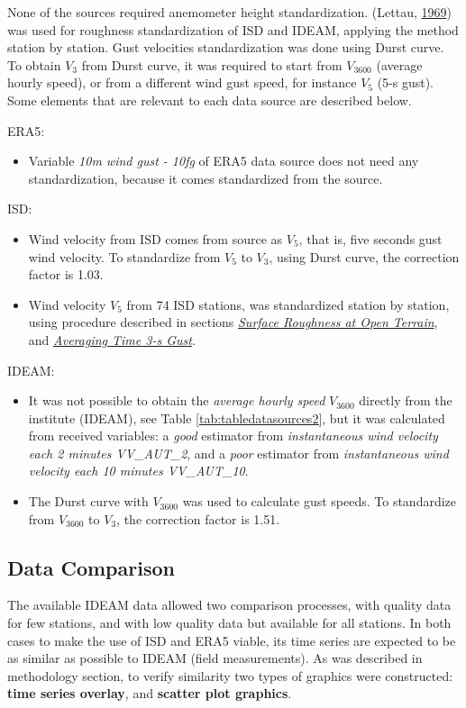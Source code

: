 \documentclass[12pt,oneside]{reedthesis}
\providecommand{\tightlist}{%
  \setlength{\itemsep}{0pt}\setlength{\parskip}{0pt}}
\begin{document}
None of the sources required anemometer height standardization. (Lettau, \protect\hyperlink{ref-Lettau1969}{1969}) was used for roughness standardization of ISD and IDEAM, applying the method station by station. Gust velocities standardization was done using Durst curve. To obtain \(V_3\) from Durst curve, it was required to start from \(V_{3600}\) (average hourly speed), or from a different wind gust speed, for instance \(V_5\) (5-s gust). Some elements that are relevant to each data source are described below.

ERA5:
\begin{itemize}
\tightlist
\item
  Variable \emph{10m wind gust - 10fg} of ERA5 data source does not need any standardization, because it comes standardized from the source.
\end{itemize}
ISD:
\begin{itemize}
\item
  Wind velocity from ISD comes from source as \(V_5\), that is, five seconds gust wind velocity. To standardize from \(V_5\) to \(V_3\), using Durst curve, the correction factor is 1.03.
\item
  Wind velocity \(V_5\) from 74 ISD stations, was standardized station by station, using procedure described in sections \emph{\protect\hyperlink{rmd-roughness}{Surface Roughness at Open Terrain}}, and \emph{\protect\hyperlink{rmd-gust}{Averaging Time 3-s Gust}}.
\end{itemize}
IDEAM:
\begin{itemize}
\item
  It was not possible to obtain the \emph{average hourly speed} \(V_{3600}\) directly from the institute (IDEAM), see Table \ref{tab:tabledatasources2}, but it was calculated from received variables: a \emph{good} estimator from \emph{instantaneous wind velocity each 2 minutes VV\_AUT\_2}, and a \emph{poor} estimator from \emph{instantaneous wind velocity each 10 minutes VV\_AUT\_10}.
\item
  The Durst curve with \(V_{3600}\) was used to calculate gust speeds. To standardize from \(V_{3600}\) to \(V_3\), the correction factor is 1.51.
\end{itemize}
\hypertarget{data-comparison}{%
\subsection{Data Comparison}\label{data-comparison}}

The available IDEAM data allowed two comparison processes, with quality data for few stations, and with low quality data but available for all stations. In both cases to make the use of ISD and ERA5 viable, its time series are expected to be as similar as possible to IDEAM (field measurements). As was described in methodology section, to verify similarity two types of graphics were constructed: \textbf{time series overlay}, and \textbf{scatter plot graphics}.
\end{document}

